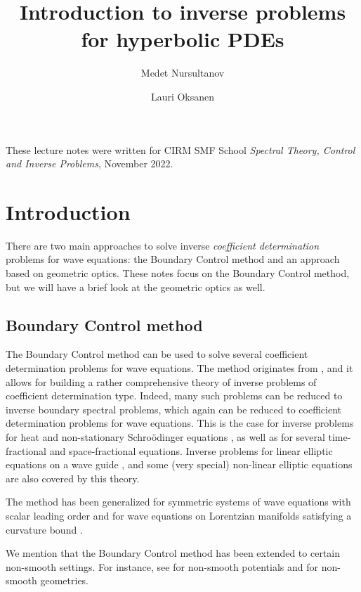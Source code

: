 \documentclass[12pt,oneside,final]{amsart}
\title{Introduction to inverse problems for hyperbolic PDEs}
\author[]{Medet Nursultanov}
\author[]{Lauri Oksanen}
\begin{document}
\maketitle





\tableofcontents


These lecture notes were written for CIRM SMF School {\em Spectral Theory, Control and Inverse Problems}, November 2022. 



\section{Introduction}

There are two main approaches to solve inverse {\em coefficient determination} problems for wave equations: the Boundary Control method and an approach based on geometric optics. 
These notes focus on the Boundary Control method, but we will have a brief look at the geometric optics as well. 


\subsection{Boundary Control method}

The Boundary Control method can be used to solve several coefficient determination problems for wave equations.
The method originates from \cite{Belishev87}, and it allows for building a rather comprehensive theory of inverse problems of coefficient determination type. Indeed, many such problems
can be reduced to inverse boundary spectral problems, 
which again can be reduced to coefficient determination problems for wave equations. This is the case for inverse problems for heat and non-stationary Schro\"odinger equations \cite{Mandache04},
as well as for several time-fractional \cite{Kian18} and space-fractional \cite{Feizmohammadi} equations. Inverse problems for linear elliptic equations on a wave guide \cite{DSFerreira16}, and some (very special) non-linear elliptic equations \cite{Carstea} are also covered by this theory. 

The method has been generalized for symmetric systems of wave equations with scalar leading order \cite{Kurylev18} and for wave equations on Lorentzian manifolds satisfying a curvature bound \cite{Alexakis22}.

We mention that the Boundary Control method has been extended to certain non-smooth settings. For instance, see \cite{KianMoranceyOksanen,LiuSaksalaYan} for non-smooth potentials and \cite{AndersonKatsudaKurylev,IsozakiKurylevLassas2015,IsozakiKurylevLassas2017,KirpichnikovaKurylev} for non-smooth geometries.
\end{document}
